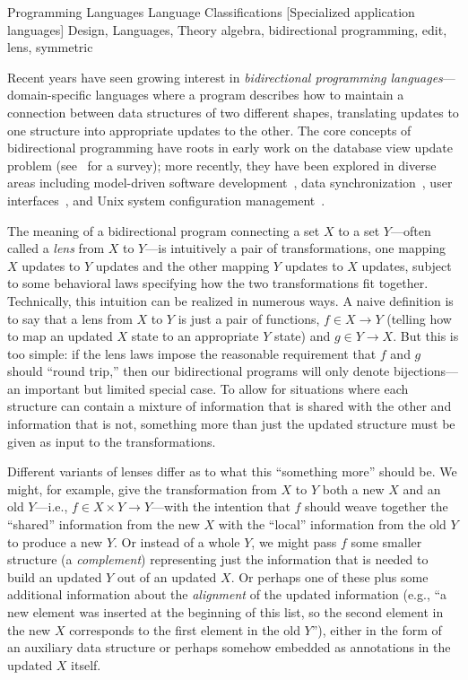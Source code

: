 \documentclass{sigplanconf}
\begin{document}
    {Programming Languages}
    {Language Classifications}
    [Specialized application languages]
\terms Design, Languages, Theory
\keywords algebra, bidirectional programming, edit, lens, symmetric


Recent years have seen growing interest in {\em bidirectional
  programming languages}---domain-specific languages where a
program describes how to maintain a connection between data structures
of two different shapes, translating updates to one structure into
appropriate updates to the other.  The core concepts of bidirectional
programming have roots in early work on the database view update
problem (see~\cite{Focal2005-shortcite} for a survey); more recently, they have
been explored in diverse areas including model-driven software
development~\cite{Stevens07}, data synchronization~\cite{Focal2005-shortcite},
user interfaces~\cite{Meertens98}, and Unix system configuration
management~\cite{Augeas}.\iflater{}\fi
  
The meaning of a bidirectional program connecting a set $X$ to a set
$Y$---often called a {\em lens} from $X$ to $Y$---is intuitively a
pair of transformations, one mapping $X$ updates to $Y$ updates and
the other mapping $Y$ updates to $X$ updates, subject to some
behavioral laws specifying how the two transformations fit together.
Technically, this intuition can be realized in numerous ways.  A naive
definition is to say that a lens from $X$ to $Y$ is just
a pair of functions, $f \in X \to Y$ (telling how to map an updated
$X$ state to an appropriate $Y$ state) and $g \in Y \to X$.  But this
is too simple: if the lens laws impose the reasonable requirement that
$f$ and $g$ should ``round trip,'' then our bidirectional programs
will only denote bijections---an important but limited special case.
%
To allow for situations where each structure can contain a mixture of
information that is shared with the other and information that is not,
something more than just the updated structure must be given as input
to the transformations.

Different variants of lenses differ as to what this ``something more''
should be.  We might, for example, give the transformation from $X$ to
$Y$ both a new $X$ and an old $Y$---i.e., $f \in X \times Y \to
Y$---with the intention that $f$ should weave together the ``shared''
information from the new $X$ with the ``local'' information from the
old $Y$ to produce a new $Y$.  Or instead of a whole
$Y$, we might pass $f$ some smaller structure (a {\em complement})
representing just 
the information that is needed to build an updated $Y$ out of an
updated $X$.  Or perhaps one of these plus some additional information
about the {\em alignment} of the updated information (e.g., ``a new
element was inserted at the beginning of this list, so the second
element in the new $X$ corresponds to the first element in the old
$Y$''), either in the form of an auxiliary data structure or
perhaps somehow embedded as annotations in the updated $X$ itself.
 
\end{document}
